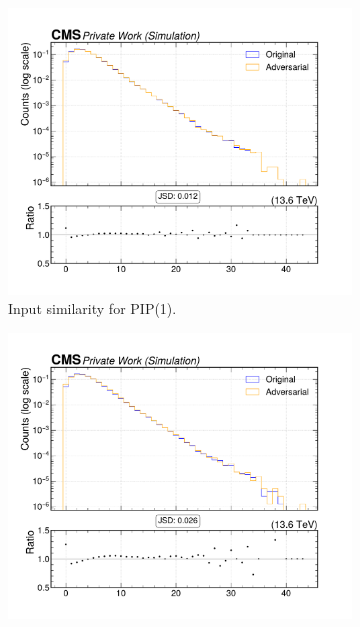 \begin{figure}[htbp]
  \centering
  \begin{subfigure}[t]{0.32\textwidth}
    \includegraphics[width=\linewidth]{media/output/features/compare/intprob_1/cmp_global_features_n_Npfcand.pdf}
    \caption{Input similarity for PIP(1).}
  \end{subfigure}\hfill
  \begin{subfigure}[t]{0.32\textwidth}
    \includegraphics[width=\linewidth]{media/output/features/compare/intprob_2/cmp_global_features_n_Npfcand.pdf}

\end{subfigure}
\end{figure}
